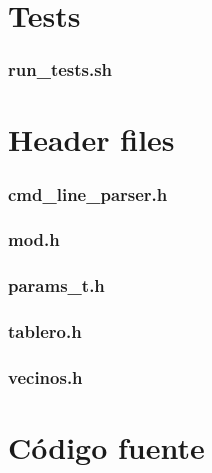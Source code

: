 \documentclass[a4paper,12pt]{article}
\numberwithin{equation}{section}
\numberwithin{figure}{section}
\begin{document}
\section{Tests}\label{appendix_tests}

\subsubsection{run\_tests.sh}\label{app_run_tests}


\clearpage
\section{Header files}\label{appendix_headers}

\subsubsection{cmd\_line\_parser.h}\label{app_cmd_line_parser_h}

\clearpage

\subsubsection{mod.h}\label{app_mod_h}

\clearpage

\subsubsection{params\_t.h}\label{app_params_t_h}

\clearpage

\subsubsection{tablero.h}\label{app_tablero_h}

\clearpage

\subsubsection{vecinos.h}\label{app_vecinos_h}

\clearpage


\clearpage
\section{Código fuente}\label{appendix_codigo_fuente}
\end{document}
